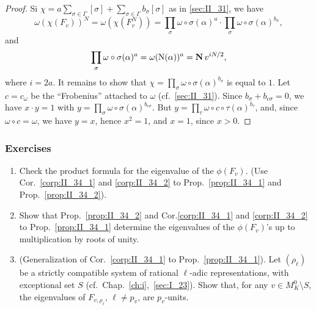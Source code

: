 \begin{proof}
Si $\chi = a \sum_{\sigma \in \Gamma} [\sigma] + \sum_{\sigma \in \Gamma}
b_\sigma[\sigma]$ as in \ref{sec:II_31}, we have
\[
\omega(\chi(F_v))^N = \omega(\chi(F_v^N))
= \prod_{\sigma} \omega \circ \sigma(\alpha)^a \cdot \prod_{\sigma} 
\omega \circ \sigma(\alpha)^{b_\sigma},
\]
\dpage
and
\[
	\prod_{\sigma} \omega \circ \sigma(\alpha)^a = \omega(\operatorname{N}(\alpha))^a
	= \operatorname{\mathbf{N}} v^{i N/2},
\]
where $i = 2a$. It remains to show that 
$\chi = \prod_{\sigma} \omega \circ \sigma(\alpha)^{b_\sigma}$ is equal to $1$. 
Let $c = c_\omega$ be the ``Frobenius'' attached to $\omega$ (cf.\
\ref{sec:II_31}). 
Since $b_\sigma + b_{c \sigma} = 0$, we have $x \cdot y = 1$ with 
$y = \prod_{\sigma} \omega \circ \sigma(\alpha)^{b_{c\sigma}}$. But 
$y = \prod_{\tau} \omega \circ c \circ \tau(\alpha)^{b_\tau}$, and, since 
$\omega \circ c = \omega$, we have $y = x$, hence $x^2 = 1$, and $x = 1$, 
since $x > 0$.
\end{proof}

\subsubsection*{Exercises}
\begin{enumerate}
	\item Check the product formula for the eigenvalue of the $\phi(F_v)$. 
(Use Cor.~\ref{corp:II_34_1} and \ref{corp:II_34_2} to Prop.~\ref{prop:II_34_1}
and Prop.~\ref{prop:II_34_2}).
	\item Show that Prop.~\ref{prop:II_34_2} and Cor.\ref{corp:II_34_1} and
\ref{corp:II_34_2} to Prop.~\ref{prop:II_34_1} determine the eigenvalues of the
$\phi(F_v)$'s up to multiplication by roots of unity. 
	\item (Generalization of Cor.~\ref{corp:II_34_1} to
Prop.~\ref{prop:II_34_1}). Let $(\rho_\ell)$ be a strictly compatible system of
rational $\ell$-adic representations, with exceptional set $S$ (cf.\
Chap.~\ref{ch:i},~\ref{sec:I_23}). Show that, for any $v \in M_K^0 \setminus
S$, the eigenvalues of $F_{v,\rho_\ell}$, $\ell \neq p_v$, are $p_v$-units.
\end{enumerate}

